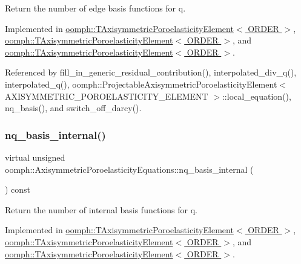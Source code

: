 Return the number of edge basis functions for q. 



Implemented in \hyperlink{classoomph_1_1TAxisymmetricPoroelasticityElement_a55279875613735471b7b925116e85292}{oomph\+::\+T\+Axisymmetric\+Poroelasticity\+Element$<$ O\+R\+D\+E\+R $>$}, \hyperlink{classoomph_1_1TAxisymmetricPoroelasticityElement_ac8bf7a876d0d1411cdeda49d416b3369}{oomph\+::\+T\+Axisymmetric\+Poroelasticity\+Element$<$ O\+R\+D\+E\+R $>$}, and \hyperlink{classoomph_1_1TAxisymmetricPoroelasticityElement_adcb6279faff778530b9fb118f56636e4}{oomph\+::\+T\+Axisymmetric\+Poroelasticity\+Element$<$ O\+R\+D\+E\+R $>$}.



Referenced by fill\+\_\+in\+\_\+generic\+\_\+residual\+\_\+contribution(), interpolated\+\_\+div\+\_\+q(), interpolated\+\_\+q(), oomph\+::\+Projectable\+Axisymmetric\+Poroelasticity\+Element$<$ A\+X\+I\+S\+Y\+M\+M\+E\+T\+R\+I\+C\+\_\+\+P\+O\+R\+O\+E\+L\+A\+S\+T\+I\+C\+I\+T\+Y\+\_\+\+E\+L\+E\+M\+E\+N\+T $>$\+::local\+\_\+equation(), nq\+\_\+basis(), and switch\+\_\+off\+\_\+darcy().

\mbox{\label{classoomph_1_1AxisymmetricPoroelasticityEquations_afa7d0f89a144f2031959d750f7b3ebc1}} 
\subsubsection{\texorpdfstring{nq\+\_\+basis\+\_\+internal()}{nq\_basis\_internal()}}
{\footnotesize\ttfamily virtual unsigned oomph\+::\+Axisymmetric\+Poroelasticity\+Equations\+::nq\+\_\+basis\+\_\+internal (\begin{DoxyParamCaption}{ }\end{DoxyParamCaption}) const\hspace{0.3cm}{\ttfamily [pure virtual]}}



Return the number of internal basis functions for q. 



Implemented in \hyperlink{classoomph_1_1TAxisymmetricPoroelasticityElement_adab98934a20e65055bdc477824c8c5ef}{oomph\+::\+T\+Axisymmetric\+Poroelasticity\+Element$<$ O\+R\+D\+E\+R $>$}, \hyperlink{classoomph_1_1TAxisymmetricPoroelasticityElement_a712947a5033fb2b36f1aae345ff3b366}{oomph\+::\+T\+Axisymmetric\+Poroelasticity\+Element$<$ O\+R\+D\+E\+R $>$}, and \hyperlink{classoomph_1_1TAxisymmetricPoroelasticityElement_a3044d14c97b11bc95560356dfb684a4b}{oomph\+::\+T\+Axisymmetric\+Poroelasticity\+Element$<$ O\+R\+D\+E\+R $>$}.



